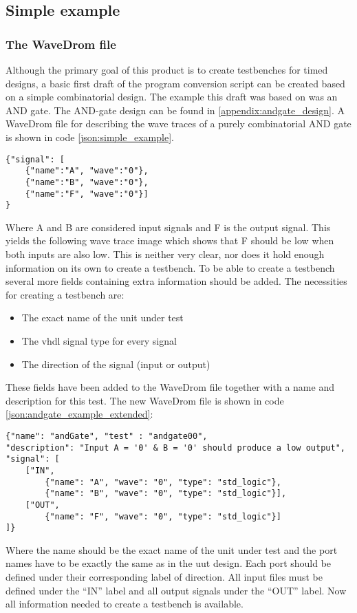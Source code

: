 \subsection{Simple example}
\subsubsection{The WaveDrom file}
Although the primary goal of this product is to create testbenches for timed designs, a basic first draft of the program conversion script can be created based on a simple combinatorial design.
\npar
The example this draft was based on was an AND gate. The AND-gate design can be found in \ref{appendix:andgate_design}.
\npar
A WaveDrom file for describing the wave traces of a purely combinatorial AND gate is shown in code \ref{json:simple_example}.
\begin{lstlisting}[style=json, caption={Standard WaveDrom description for a combinatorial AND-gate}, label={json:simple_example}]
{"signal": [
	{"name":"A", "wave":"0"},
	{"name":"B", "wave":"0"},
	{"name":"F", "wave":"0"}]  
}
\end{lstlisting}\noindent
Where A and B are considered input signals and F is the output signal. This yields the following wave trace image which shows that F should be low when both inputs are also low.
\nline
This is neither very clear, nor does it hold enough information on its own to create a testbench.
To be able to create a testbench several more fields containing extra information should be added.
\npar
The necessities for creating a testbench are:
\begin{itemize}
	\item The exact name of the unit under test
	\item The vhdl signal type for every signal
	\item The direction of the signal (input or output)
\end{itemize}\noindent
These fields have been added to the WaveDrom file together with a name and description for this test. The new WaveDrom file is shown in code \ref{json:andgate_example_extended}:\newpage
\begin{lstlisting}[style=json, caption={Extended WaveDrom description for a combinatorial AND-gate}, label={json:andgate_example_extended}]
{"name": "andGate", "test" : "andgate00", 
"description": "Input A = '0' & B = '0' should produce a low output", 
"signal": [
	["IN",
		{"name": "A", "wave": "0", "type": "std_logic"},
		{"name": "B", "wave": "0", "type": "std_logic"}],
	["OUT",
		{"name": "F", "wave": "0", "type": "std_logic"}]
]}
\end{lstlisting}\noindent
Where the name should be the exact name of the unit under test and the port names have to be exactly the same as in the uut design. Each port should be defined under their corresponding label of direction. All input files must be defined under the “IN” label and all output signals under the “OUT” label. Now all information needed to create a testbench is available.
